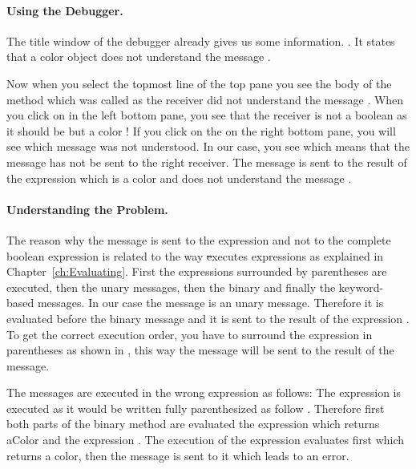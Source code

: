 \paragraph{Using the Debugger.}
The title window of the debugger already gives us some information. . It states that  a color object does not understand the message . 

Now when you select the topmost line of the top pane you see the body of the method  which was called as the receiver did not understand the message . When you click on  in the left bottom pane, you see that the receiver is not a boolean as it should be but a color ! If you click on the  on the right bottom pane, you will see which message was not understood. In our case, you see  which means that the message  has not be sent to the right receiver. The message  is sent to the result of the expression  which is a color and does not understand the message . 


\paragraph{Understanding the Problem.}
The reason why the message  is sent to the expression  and not to the complete boolean expression is related to the way \st executes expressions as explained in Chapter~\ref{ch:Evaluating}. First the expressions surrounded by parentheses are executed, then the unary messages, then the binary and finally the keyword-based messages. In our case the message  is an unary message. Therefore it is evaluated before the binary message \ct{=} and  it is sent to the result of the expression . To get the correct execution order, you have to surround the expression in parentheses as shown in , this way the message  will be sent to the result of the \ct{=} message. 

The messages are executed in the wrong expression as follows: The expression  is executed as it would be written fully parenthesized as follow . Therefore first both parts of the binary method \ct{=} are evaluated \ie the expression  which returns aColor and the expression
. The execution of the expression  evaluates first  which returns a color, then the message  is sent to it which leads to an error.


